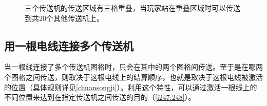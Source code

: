 \begin{figure}[!ht]
\begin{center}
\qquad
{}
\end{center}
\caption{三个传送机的传送区域有三格重叠，当玩家站在重叠区域时可以传送到共20个其他传送机上。}
\label{i245:246}
\end{figure}

\subsection{用一根电线连接多个传送机}
当一根线连接了多个传送机图格时，只会在其中的两个图格间传送。至于是在哪两个图格之间传送，则取决于这根电线上的结算顺序，也就是取决于这根电线被激活的位置（具体规则详见\autoref{chuansongji}）。利用这个特性，可以通过激活一根线上的不同位置来达到在指定传送机之间传送的目的（\autoref{i247:248}）。

